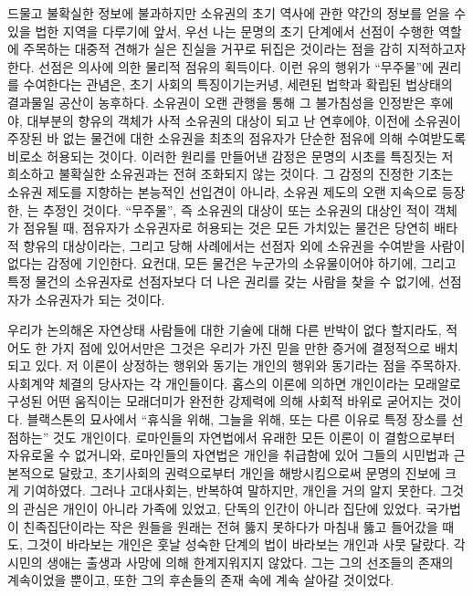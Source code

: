 드물고 불확실한 정보에 불과하지만
소유권의 초기 역사에 관한 약간의 정보를 얻을 수 있을 법한 지역을 다루기에 앞서,
우선 나는
문명의 초기 단계에서 선점이 수행한 역할에 주목하는 대중적 견해가
실은 진실을 거꾸로 뒤집은 것이라는 점을 감히 지적하고자 한다.
선점은 의사에 의한 물리적 점유의 획득이다.
이런 유의 행위가 ``무주물''에 권리를 수여한다는 관념은,
초기 사회의 특징이기는커녕,
세련된 법학과 확립된 법상태의 결과물일 공산이 농후하다.
소유권이
오랜 관행을 통해
그 불가침성을
인정받은 후에야,
대부분의 향유의 객체가 사적 소유권의 대상이 되고 난 연후에야,
이전에 소유권이 주장된 바 없는 물건에 대한 소유권을
최초의 점유자가
단순한 점유에 의해
수여받도록
비로소
허용되는 것이다.
이러한 원리를 만들어낸 감정은
문명의 시초를 특징짓는
저 희소하고 불확실한 소유권과는 전혀 조화되지 않는 것이다.
그 감정의 진정한 기초는
소유권 제도를 지향하는 본능적인 선입견이 아니라,
소유권 제도의 오랜 지속으로 등장한,
는 추정인 것이다.
``무주물'', 즉
소유권의 대상이 
또는 소유권의 대상인 적이 
객체가 점유될 때,
점유자가 소유권자로 허용되는 것은
모든 가치있는 물건은 당연히 배타적 향유의 대상이라는,
그리고
당해 사례에서는
선점자 외에 소유권을 수여받을 사람이 없다는 감정에
기인한다.
요컨대,
모든 물건은 누군가의 소유물이어야 하기에,
그리고
특정 물건의 소유권자로 선점자보다 더 나은 권리를 갖는
사람을 찾을 수 없기에,
선점자가 소유권자가 되는 것이다.

우리가 논의해온 자연상태 사람들에 대한 기술에 대해
다른 반박이 없다 할지라도,
적어도 한 가지 점에 있어서만은
그것은 우리가 가진 믿을 만한 증거에 결정적으로 배치되고 있다.
저 이론이 상정하는 행위와 동기는 개인의 행위와 동기라는 점을 주목하자.
사회계약 체결의 당사자는 각 개인들이다.
홉스의 이론에 의하면
개인이라는 모래알로 구성된 어떤 움직이는 모래더미가
완전한 강제력에 의해 사회적 바위로 굳어지는 것이다.
블랙스톤의 묘사에서
``휴식을 위해, 그늘을 위해, 또는 다른 이유로 특정 장소를 선점하는''
것도 개인이다.
로마인들의 자연법에서 유래한 모든 이론이
이 결함으로부터 자유로울 수 없거니와,
로마인들의 자연법은 개인을 취급함에 있어 그들의 시민법과 근본적으로 달랐고,
초기사회의 권력으로부터 개인을 해방시킴으로써
문명의 진보에 크게 기여하였다.
그러나 고대사회는, 반복하여 말하지만,
개인을 거의 알지 못한다.
그것의 관심은 개인이 아니라 가족에 있었고,
단독의 인간이 아니라 집단에 있었다.
국가법이 친족집단이라는 작은 원들을
원래는 전혀 뚫지 못하다가
마침내 뚫고 들어갔을 때도,
그것이 바라보는 개인은 훗날 성숙한 단계의 법이 바라보는 개인과
사뭇 달랐다.
각 시민의 생애는
출생과 사망에 의해 한계지워지지 않았다.
그는 그의 선조들의 존재의 계속이었을 뿐이고,
또한 그의 후손들의 존재 속에 계속 살아갈 것이었다.


